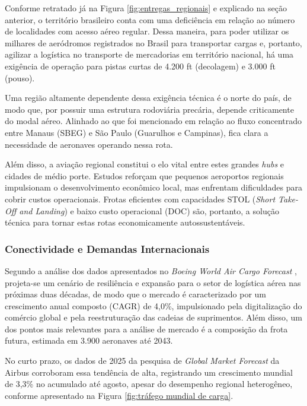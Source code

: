 Conforme retratado já na Figura \ref{fig:entregas_regionais} e explicado na seção anterior, o território brasileiro conta com uma deficiência em relação ao número de localidades com acesso aéreo regular. Dessa maneira, para poder utilizar os milhares de aeródromos registrados no Brasil para transportar cargas e, portanto, agilizar a logística no transporte de mercadorias em território nacional, há uma exigência de operação para pistas curtas de 4.200 ft (decolagem) e 3.000 ft (pouso).

Uma região altamente dependente dessa exigência técnica é o norte do país, de modo que, por possuir uma estrutura rodoviária precária, depende criticamente do modal aéreo. Alinhado ao que foi mencionado em relação ao fluxo concentrado entre Manaus (SBEG) e São Paulo (Guarulhos e Campinas), fica clara a necessidade de aeronaves operando nessa rota.

Além disso, a aviação regional constitui o elo vital entre estes grandes \textit{hubs} e cidades de médio porte. Estudos reforçam que pequenos aeroportos regionais impulsionam o desenvolvimento econômico local, mas enfrentam dificuldades para cobrir custos operacionais. Frotas eficientes com capacidades STOL (\textit{Short Take-Off and Landing}) e baixo custo operacional (DOC) são, portanto, a solução técnica para tornar estas rotas economicamente autossustentáveis.

\subsubsection{Conectividade e Demandas Internacionais}

Segundo a análise dos dados apresentados no \textit{Boeing World Air Cargo Forecast} \cite{boeing2024wacf}, projeta-se um cenário de resiliência e expansão para o setor de logística aérea nas próximas duas décadas, de modo que o mercado é caracterizado por um crescimento anual composto (CAGR) de 4,0\%, impulsionado pela digitalização do comércio global e pela reestruturação das cadeias de suprimentos. Além disso, um dos pontos mais relevantes para a análise de mercado é a composição da frota futura, estimada em 3.900 aeronaves até 2043.

No curto prazo, os dados de 2025 da pesquisa de \textit{Global Market Forecast} da Airbus \cite{airbus2025gmf} corroboram essa tendência de alta, registrando um crescimento mundial de 3,3\% no acumulado até agosto, apesar do desempenho regional heterogêneo, conforme apresentado na Figura \ref{fig:tráfego mundial de carga}.

